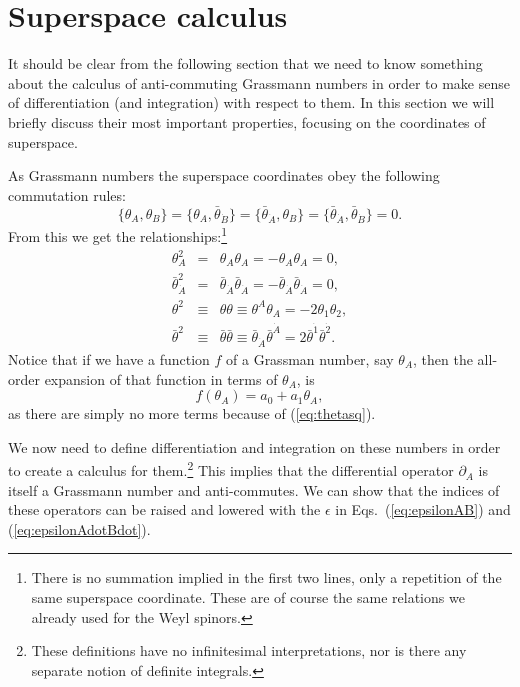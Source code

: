 \documentclass[notes.tex]{subfiles}
\begin{document}
\section{Superspace calculus}
\label{sec:calc}
It should be clear from the following section that we need to know something about the calculus of anti-commuting Grassmann numbers in order to make sense of differentiation (and integration) with respect to them. In this section we will briefly discuss their most important properties, focusing on the coordinates of superspace.

As Grassmann numbers the superspace coordinates obey the following commutation rules:
\[\{\theta_A, \theta_B\} = \{\theta_A, \bar{\theta}_{\dot{B}}\} = \{ \bar{\theta}_{\dot{A}}, \theta_B\} = \{\bar{\theta}_{\dot{A}}, \bar{\theta}_{\dot{B}}\} =0.\]
From this we get the relationships:\footnote{There is no summation implied in the first two lines, only a repetition of the same superspace coordinate. These are of course the same relations we already used for the Weyl spinors.}
\begin{eqnarray}
\theta_A^2 &=& \theta_A \theta_A = -\theta_A \theta_A = 0, \label{eq:thetasq}\\
\bar{\theta}_{\dot{A}}^2 &=& \bar{\theta}_{\dot{A}}\bar{\theta}_{\dot{A}} = -\bar{\theta}_{\dot{A}}\bar{\theta}_{\dot{A}} = 0, \\
\theta^2 &\equiv& \theta\theta \equiv \theta^A\theta_A = -2\theta_1\theta_2,\\
\bar{\theta}^2 &\equiv& \bar{\theta}\bar{\theta} \equiv \bar{\theta}_{\dot{A}}\bar{\theta}^{\dot{A}} = 2\bar{\theta}^{\dot{1}}\bar{\theta}^{\dot{2}}.
\end{eqnarray}
Notice that if we have a function $f$ of a Grassman number, say $\theta_A$, then the all-order expansion of that function in terms of $\theta_A$, is
\begin{equation}
f(\theta_A) = a_0 + a_1 \theta_A,\label{eq:fexp}
\end{equation}
as there are simply no more terms because of (\ref{eq:thetasq}).

We now need to define differentiation and integration on these numbers in order to create a calculus for them.\footnote{These definitions have no infinitesimal interpretations, nor is there any separate notion of definite integrals.}
 This implies that the differential operator $\partial_A$ is itself a Grassmann number and anti-commutes. We can show that the indices of these operators can be raised and lowered with the $\epsilon$ in Eqs.~(\ref{eq:epsilonAB}) and (\ref{eq:epsilonAdotBdot}).
\end{document}
